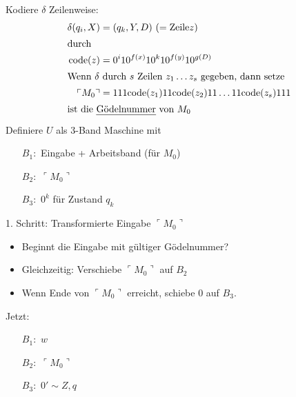Kodiere $\delta$ Zeilenweise:
\begin{align*}
	\delta(q_i,X) &= (q_k,Y,D) \ (= \text{Zeile} z)\\
\shortintertext{durch}
	\mathrm{code}(z) &= 0^i10^{f(x)}10^k10^{f(y)}10^{g(D)}\\
\shortintertext{Wenn $\delta$ durch $s$ Zeilen $z_1\dots z_s$ gegeben, dann setze}
	\ulcorner M_0 \urcorner &= 111 \mathrm{code}(z_1) 11 \mathrm{code}(z_2) 11 \dots 11 \mathrm{code}(z_s) 111\\
\shortintertext{ist die \emph{Gödelnummer} von $M_0$}
\end{align*}
Definiere $U$ als 3-Band Maschine mit
\begin{itemize}
\item[$B_1:$] Eingabe + Arbeitsband (für $M_0$)
\item[$B_2:$] $\ulcorner M_0 \urcorner$
\item[$B_3:$] $0^k$ für Zustand $q_k$
\end{itemize}
1. Schritt: Transformierte Eingabe
$\ulcorner M_0 \urcorner$
\begin{itemize}
\item Beginnt die Eingabe mit gültiger Gödelnummer?
\item Gleichzeitig: Verschiebe $\ulcorner M_0 \urcorner$ auf $B_2$
\item Wenn Ende von $\ulcorner M_0 \urcorner$ erreicht, schiebe 0 auf $B_3$.
\end{itemize}
Jetzt:
\begin{itemize}
\item[$B_1:$] $w$
\item[$B_2:$] $\ulcorner M_0 \urcorner$
\item[$B_3:$] $0' \sim Z,q$
\end{itemize}


\vspace{1em}

